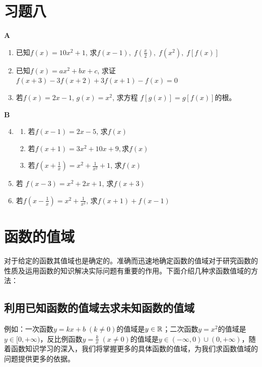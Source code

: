 \section*{习题八}
\begin{center}
    \bfseries A
\end{center}

\begin{enumerate}
    \item 已知$f(x)=10x^2+1$, 求$f(x-1),\; f\left(\frac{x}{2}\right),\; f(x^{2}),\; f[f(x)]$
    \item 已知$f(x)=ax^2+bx+c$, 求证$f(x+3)-3f(x+2)+3f(x+1)-f(x)=0$
    \item 若$f(x)=2x-1$, $g(x)=x^{2}$, 求方程
$f[g(x)]=g[f(x)]$的根。
\end{enumerate}




\begin{center}
    \bfseries B
\end{center}

\begin{enumerate}\setcounter{enumi}{3}
    \item \begin{enumerate}[(1)]
    \item 若$f(x-1)=2x-5$, 求$f(x)$
    \item 若$f(x+1)=3x^2+10x+9, 求f(x)$
    \item 若$f\left(x+\frac1x\right)=x^2+\frac1{x^2}+1$, 求$f(x)$        
    \end{enumerate} 

 \item 若 $f(x-3)=x^{2}+2x+1$, 求$f(x+3)$
 \item 若$f\left(x-\frac1x\right)=x^2+\frac1{x^2}$, 求$f(x+1)+f(x-1)$
\end{enumerate}

\section{函数的值域}

对于给定的函数其值域也是确定的。准确而迅速地确定函数的值域对于研究函数的性质及运用函数的知识解决实际问题有重要的作用。下面介绍几种求函数值域的方法：

\subsection{利用已知函数的值域去求未知函数的值域}
例如：一次函数$y=kx+b\; (k\ne 0)$的值域是$y\in\mathbb{R}$；二次函数$y=x^2$的值域是$y\in [0,+\infty)$，反比例函数$y=\frac{k}{x}\; (x\ne 0)$的值域是$y\in (-\infty,0)\cup (0,+\infty)$，随着函数知识学习的深入，我们将掌握更多的具体函数的值域，为我们求函数值域的问题提供更多的依据。

